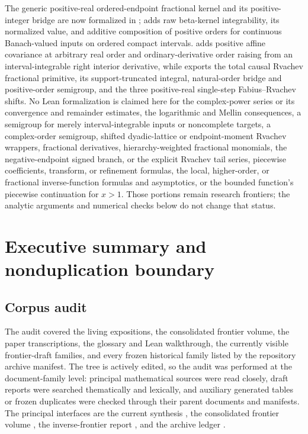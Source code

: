 \documentclass[11pt,oneside]{article}
\theoremstyle{definition}
\theoremstyle{remark}
\newcommand{\1}{\mathbf 1}
\begin{document}
\begin{boxedremark}
The generic positive-real ordered-endpoint fractional kernel and its positive-integer
bridge are now formalized in ;
 adds raw beta-kernel integrability, its
normalized value, and additive composition of positive orders for continuous Banach-valued
inputs on ordered compact intervals.   adds
positive affine covariance at arbitrary real order and ordinary-derivative order raising
from an interval-integrable right interior derivative, while
 exports the total causal Rvachev fractional
primitive, its support-truncated integral, natural-order bridge and positive-order semigroup,
and the three positive-real single-step Fabius--Rvachev shifts.  No Lean
formalization is claimed here for the complex-power series or its convergence and remainder
estimates, the logarithmic and Mellin consequences, a semigroup for merely
interval-integrable inputs or noncomplete targets, a complex-order semigroup, shifted
dyadic-lattice or endpoint-moment Rvachev wrappers, fractional derivatives,
hierarchy-weighted fractional monomials, the negative-endpoint signed branch, or the
explicit Rvachev tail series, piecewise coefficients, transform, or refinement formulas,
the local, higher-order, or fractional inverse-function formulas and
asymptotics, or the bounded function's
piecewise continuation for $x>1$.  Those portions remain research frontiers;
the analytic arguments and numerical checks below do not change that status.
\end{boxedremark}


\newpage

\section{Executive summary and nonduplication boundary}
\label{p2:sec:executive}

\subsection{Corpus audit}
The audit covered the living expositions, the consolidated frontier volume, the
paper transcriptions, the glossary and Lean walkthrough, the currently visible
frontier-draft families, and every frozen historical family listed by the
repository archive manifest.  The tree is actively edited, so the audit was
performed at the document-family level: principal mathematical sources were
read closely, draft reports were searched thematically and lexically, and
auxiliary generated tables or frozen duplicates were checked through their
parent documents and manifests.  The principal interfaces are the current
synthesis \cite{p2:ProveItPrimary}, the consolidated frontier volume
\cite{p2:ProveItFrontiers}, the inverse-frontier report \cite{p2:ProveItInverse}, and
the archive ledger \cite{p2:ProveItArchive}.
\end{document}
